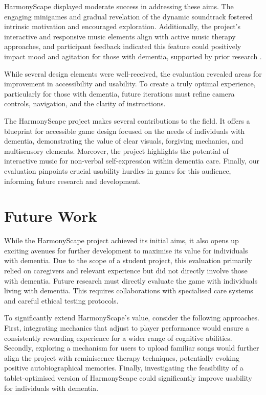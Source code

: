 \documentclass{l4proj}
\begin{document}
HarmonyScape displayed moderate success in addressing these aims. The engaging minigames and gradual revelation of the dynamic soundtrack fostered intrinsic motivation and encouraged exploration. Additionally, the project's interactive and responsive music elements align with active music therapy approaches, and participant feedback indicated this feature could positively impact mood and agitation for those with dementia, supported by prior research \citep{sanchez_comparing_2016}.

While several design elements were well-received, the evaluation revealed areas for improvement in accessibility and usability. To create a truly optimal experience, particularly for those with dementia, future iterations must refine camera controls, navigation, and the clarity of instructions.

The HarmonyScape project makes several contributions to the field. It offers a blueprint for accessible game design focused on the needs of individuals with dementia, demonstrating the value of clear visuals, forgiving mechanics, and multisensory elements. Moreover, the project highlights the potential of interactive music for non-verbal self-expression within dementia care. Finally, our evaluation pinpoints crucial usability hurdles in games for this audience, informing future research and development.

\section{Future Work}

While the HarmonyScape project achieved its initial aims, it also opens up exciting avenues for further development to maximise its value for individuals with dementia. Due to the scope of a student project, this evaluation primarily relied on caregivers and relevant experience but did not directly involve those with dementia. Future research must directly evaluate the game with individuals living with dementia. This requires collaborations with specialised care systems and careful ethical testing protocols.

To significantly extend HarmonyScape's value, consider the following approaches. First, integrating mechanics that adjust to player performance would ensure a consistently rewarding experience for a wider range of cognitive abilities. Secondly, exploring a mechanism for users to upload familiar songs would further align the project with reminiscence therapy techniques, potentially evoking positive autobiographical memories. Finally, investigating the feasibility of a tablet-optimised version of HarmonyScape could significantly improve usability for individuals with dementia.
\end{document}
